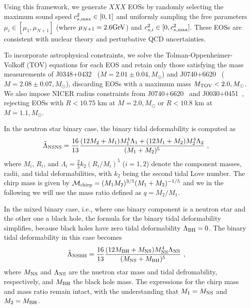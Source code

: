 \documentclass[twocolumn]{aastex631}
\begin{document}
	Using this framework, we generate $XXX$ EOSs by randomly selecting the maximum sound speed $c_{s,{\rm max}}^2 \in [0,1]$ and uniformly sampling the free parameters $\mu_i \in [\mu_1, \mu_{N+1}]$ (where $\mu_{N+1} = 2.6\rm GeV$) and $c_{s,i}^2 \in [0, c_{s,{\rm max}}^2]$. These EOSs are consistent with nuclear theory and perturbative QCD uncertainties.
	
	To incorporate astrophysical constraints, we solve the Tolman-Oppenheimer-Volkoff (TOV) equations for each EOS and retain only those satisfying the mass measurements of J0348+0432~\citep{Antoniadis2013} ($M = 2.01\pm 0.04,M_{\odot}$) and J0740+6620~\citep{Cromartie2019, Fonseca2021} ($M = 2.08 \pm 0.07,M_{\odot}$), discarding EOSs with a maximum mass $M_{\rm TOV} < 2.0,M_{\odot}$. We also impose NICER radius constraints from J0740+6620~\citep{Miller2021, Riley2021} and J0030+0451~\citep{Riley2019, MCMiller2019b}, rejecting EOSs with $R < 10.75$ km at $M = 2.0,M_{\odot}$ or $R < 10.8$ km at $M = 1.1,M_{\odot}$.
	
	In the neutron star binary case, the binary tidal deformability is computed as
	\begin{equation} 
		\tilde{\Lambda}_{\rm NSNS} = \frac{16}{13} \frac{ (12M_2 + M_1) M_1^4 \Lambda_1 + (12M_1 + M_2) M_2^4 \Lambda_2}{(M_1 + M_2)^5}~,
	\end{equation}
	where $M_i$, $R_i$, and $\Lambda_i = \frac{2}{3} k_2 \left( R_i/M_i \right)^5$ ($i=1,2$) denote the component masses, radii, and tidal deformabilities, with $k_2$ being the second tidal Love number.
	The chirp mass is given by $\mathcal{M}_{\rm chirp} = (M_1 M_2)^{3/5} (M_1+M_2)^{-1/5}$ and we in the following we will use the mass ratio defined as $q = M_2/M_1$.
	
	In the mixed binary case, i.e., where one binary component is a neutron star and the other one a black hole, the formula for the binary tidal deformability simplifies, because black holes have zero tidal deformability $\Lambda_{\rm BH}=0$.
	The binary tidal deformability in this case becomes
	\begin{equation} 
		\tilde{\Lambda}_{\rm NSBH} = \frac{16}{13} \frac{ (12M_{\rm BH} + M_{\rm NS}) M_{\rm NS}^4 \Lambda_{\rm NS}}{(M_{\rm NS} + M_{\rm BH})^5}~,
	\end{equation}
	where $M_{\rm NS}$ and $\Lambda_{\rm NS}$ are the nuetron star mass and tidal defromability, respectively, and $M_{\rm BH}$ the black hole mass. The expressions for the chirp mass and mass ratio remain intact, with the understanding that $M_1=M_{\rm NS}$ and $M_2=M_{\rm BH}$. 
	
\end{document}

